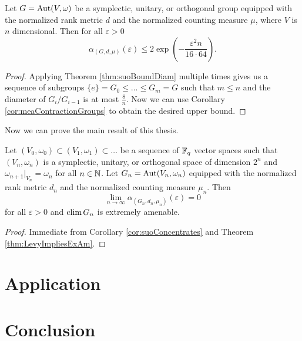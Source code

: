 \begin{corollary}\label{cor:suoConcentrates}
Let $G=\operatorname{Aut}(V,\omega)$ be a symplectic, unitary, or orthogonal group equipped with the normalized rank metric $d$ and the normalized counting measure $\mu$, where $V$ is $n$ dimensional. Then for all $\varepsilon>0$
\[\alpha_{(G,d,\mu)}(\varepsilon)\leq 2\exp\left(-\frac{\varepsilon^2n}{16\cdot64}\right).\]
\end{corollary}
\begin{proof}
Applying Theorem \ref{thm:suoBoundDiam} multiple times gives us a sequence of subgroups $\{e\}=G_0\leq \dots\leq G_m=G$ such that $m\leq n$ and the diameter of $G_i/G_{i-1}$ is at most $\frac{8}{n}$. Now we can use Corollary \ref{cor:meaContractionGroups} to obtain the desired upper bound.
\end{proof}


Now we can prove the main result of this thesis.
\begin{corollary}
Let $(V_0,\omega_0)\subset (V_1,\omega_1)\subset \dots$ be a sequence of $\mathbb{F}_q$ vector spaces such that $(V_n,\omega_n)$ is a symplectic, unitary, or orthogonal space of dimension $2^n$ and $\omega_{n+1}|_{V_n}=\omega_n$ for all $n\in\mathbb{N}$. Let $G_{n}=\operatorname{Aut}(V_n,\omega_n)$ equipped with the normalized rank metric $d_n$ and the normalized counting measure $\mu_n$. 
Then \[\lim_{n\to\infty}\alpha_{(G_n,d_n,\mu_n)}(\varepsilon)=0\] for all $\varepsilon>0$ and $\operatorname{clim} G_n$ is extremely amenable.
\end{corollary}
\begin{proof}
Immediate from Corollary \ref{cor:suoConcentrates} and Theorem \ref{thm:LevyImpliesExAm}.
\end{proof}

\section{Application}

\section{Conclusion}